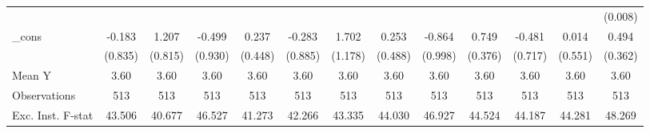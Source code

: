 {\begin{tabular}{l*{12}{c}}
            &                     &                     &                     &                     &                     &                     &                     &                     &                     &                     &                     &     (0.008)         \\
\addlinespace
\_cons      &      -0.183         &       1.207         &      -0.499         &       0.237         &      -0.283         &       1.702         &       0.253         &      -0.864         &       0.749\sym{*}  &      -0.481         &       0.014         &       0.494         \\
            &     (0.835)         &     (0.815)         &     (0.930)         &     (0.448)         &     (0.885)         &     (1.178)         &     (0.488)         &     (0.998)         &     (0.376)         &     (0.717)         &     (0.551)         &     (0.362)         \\
\midrule
Mean Y      &        3.60         &        3.60         &        3.60         &        3.60         &        3.60         &        3.60         &        3.60         &        3.60         &        3.60         &        3.60         &        3.60         &        3.60         \\
Observations&         513         &         513         &         513         &         513         &         513         &         513         &         513         &         513         &         513         &         513         &         513         &         513         \\
Exc. Inst. F-stat&      43.506         &      40.677         &      46.527         &      41.273         &      42.266         &      43.335         &      44.030         &      46.927         &      44.524         &      44.187         &      44.281         &      48.269         \\
\bottomrule
\end{tabular}
}
